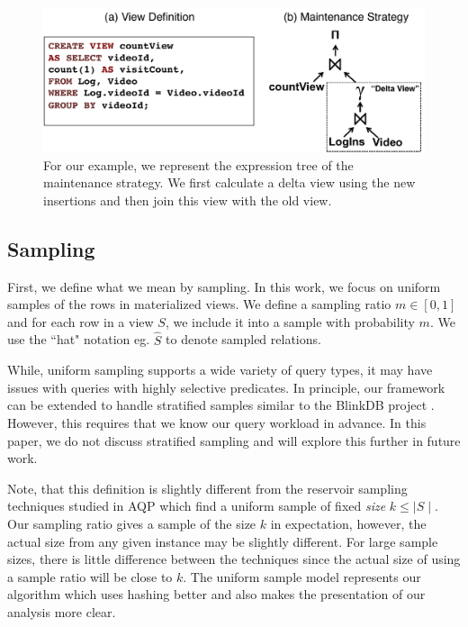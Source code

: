 \begin{figure}[t] \vspace{-2em}
\centering
 \includegraphics[scale=0.30]{figs/example_expression_tree.pdf} \vspace{-.25em}
 \caption{For our example, we represent the expression tree of the maintenance strategy. We first calculate a delta view using the new insertions and then join this view with the old view.\label{exexpr}}\vspace{-1.75em}
\end{figure}

\subsection{Sampling}
First, we define what we mean by sampling.
In this work, we focus on uniform samples of the rows in materialized views.
We define a sampling ratio $m\in [0,1]$ and for each row in a view $S$, we include it into a sample with probability $m$.
We use the ``hat" notation eg. $\hat{S}$ to denote sampled relations. 

While, uniform sampling supports a wide variety of query types, it may have issues with queries with highly selective predicates.
In principle, our framework can be extended to handle stratified samples similar to the BlinkDB project \cite{AgarwalMPMMS13}.
However, this requires that we know our query workload in advance.  
In this paper, we do not discuss stratified sampling and will explore this further in future work.

\iffalse
Note, that this definition is slightly different from the reservoir sampling techniques studied in AQP \cite{DBLP:journals/toms/Vitter85} which find a uniform sample of fixed \emph{size} $k\le \mid S \mid$.
Our sampling ratio gives a sample of the size $k$ in expectation, however, the actual size from any given instance may be slightly different.
For large sample sizes, there is little difference between the techniques since the actual size of using a sample ratio will be close to $k$.
The uniform sample model represents our algorithm which uses hashing better and also makes the presentation of our analysis more clear.

